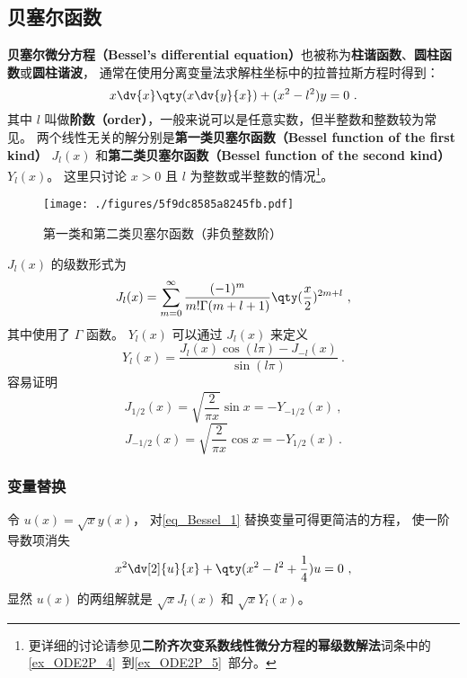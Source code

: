 

\subsection{贝塞尔函数}
\textbf{贝塞尔微分方程（Bessel's differential equation）}也被称为\textbf{柱谐函数}、\textbf{圆柱函数}或\textbf{圆柱谐波}， 通常在使用分离变量法求解柱坐标中的拉普拉斯方程时得到：
\begin{equation}\label{eq_Bessel_1}
x\dv{x}\qty(x\dv{y}{x}) + (x^2 - l ^2)y = 0~.
\end{equation}
其中 $l$ 叫做\textbf{阶数（order）}，一般来说可以是任意实数，但半整数和整数较为常见。 两个线性无关的解分别是\textbf{第一类贝塞尔函数（Bessel function of the first kind）} $J_l(x)$ 和\textbf{第二类贝塞尔函数（Bessel function of the second kind）} $Y_l(x)$。 这里只讨论 $x > 0$ 且 $l$ 为整数或半整数的情况\footnote{更详细的讨论请参见\textbf{二阶齐次变系数线性微分方程的幂级数解法}词条中的\autoref{ex_ODE2P_4}~到\autoref{ex_ODE2P_5}~部分。}。

\begin{figure}[ht]
\centering
\texttt{[image: ./figures/5f9dc8585a8245fb.pdf]}
\caption{第一类和第二类贝塞尔函数（非负整数阶）} \label{fig_Bessel_1}
\end{figure}

$J_l(x)$ 的级数形式为
\begin{equation}\label{eq_Bessel_3}
J_l(x) = \sum_{m=0}^\infty \frac{(-1)^m}{m!\Gamma(m+l+1)} \qty(\frac x2)^{2m+l}~,
\end{equation}
其中使用了 $\Gamma$ 函数。 $Y_l(x)$ 可以通过 $J_l(x)$ 来定义
\begin{equation}
Y_l(x) = \frac{J_l(x)\cos(l\pi) - J_{-l}(x)}{\sin(l\pi)}~.
\end{equation}
容易证明
\begin{equation}
J_{1/2}(x) = \sqrt{\frac{2}{\pi x}} \sin x = -Y_{-1/2}(x)~,
\end{equation}
\begin{equation}
J_{-1/2}(x) = \sqrt{\frac{2}{\pi x}} \cos x = -Y_{1/2}(x)~.
\end{equation}


\subsubsection{变量替换}
令 $u(x) = \sqrt{x} y(x)$， 对\autoref{eq_Bessel_1} 替换变量可得更简洁的方程， 使一阶导数项消失
\begin{equation}
x^2\dv[2]{u}{x} + \qty(x^2 - l^2 + \frac{1}{4}) u = 0~,
\end{equation}
显然 $u(x)$ 的两组解就是 $\sqrt{x}J_l(x)$ 和 $\sqrt{x}Y_l(x)$。

